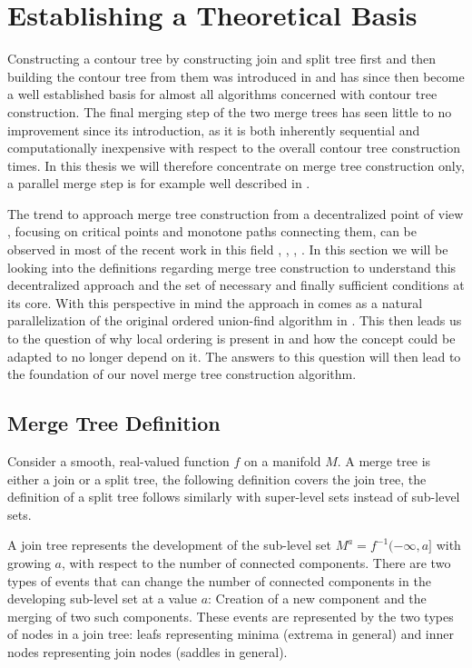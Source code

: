 \documentclass{scrartcl}
\begin{document}
\section{Establishing a Theoretical Basis} \label{sec:num2}
Constructing a contour tree by constructing join and split tree first and then building the contour tree from them was introduced in \cite{orig} and has since then become a well established basis for almost all algorithms concerned with contour tree construction. The final merging step of the two merge trees has seen little to no improvement since its introduction, as it is both inherently sequential and computationally inexpensive with respect to the overall contour tree construction times. In this thesis we will therefore concentrate on merge tree construction only, a parallel merge step is for example well described in \cite{Carr}.

The trend to approach merge tree construction from a decentralized point of view \cite{base}, focusing on critical points and monotone paths connecting them, can be observed in most of the recent work in this field \cite{Carr}, \cite{FTM}, \cite{adhoc}, \cite{Maadasamy}. In this section we will be looking into the definitions regarding merge tree construction to understand this decentralized approach and the set of necessary and finally sufficient conditions at its core. With this perspective in mind the approach in \cite{FTM} comes as a natural parallelization of the original ordered union-find algorithm in \cite{pascucci1}. This then leads us to the question of why local ordering is present in \cite{FTM} and how the concept could be adapted to no longer depend on it. The answers to this question will then lead to the foundation of our novel merge tree construction algorithm.

\subsection{Merge Tree Definition}
Consider a smooth, real-valued function \(f\) on a manifold \(M\). A merge tree is either a join or a split tree, the following definition covers the join tree, the definition of a split tree follows similarly with super-level sets instead of sub-level sets. 

A join tree represents the development of the sub-level set \(M^{a} = f^{-1}(-\infty, a]\) with growing \(a\), with respect to the number of connected components. There are two types of events that can change the number of connected components in the developing sub-level set at a value \(a\): Creation of a new component and the merging of two such components. These events are represented by the two types of nodes in a join tree: leafs representing minima (extrema in general) and inner nodes representing join nodes (saddles in general). 
\end{document}
